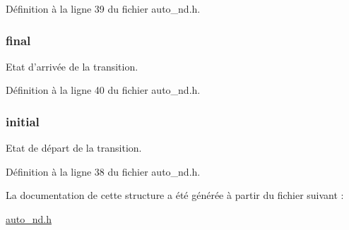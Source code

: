 \-Définition à la ligne 39 du fichier auto\-\_\-nd.\-h.

\hypertarget{struct_transition_abbe5fcc45cc44e9057bc028de5aed8a0}{
\subsubsection[{final}]{ {\bf final}}}\label{struct_transition_abbe5fcc45cc44e9057bc028de5aed8a0}
\-Etat d'arrivée de la transition. 

\-Définition à la ligne 40 du fichier auto\-\_\-nd.\-h.

\hypertarget{struct_transition_a90d9e6858a2ca20ec81be04500590396}{
\subsubsection[{initial}]{ {\bf initial}}}\label{struct_transition_a90d9e6858a2ca20ec81be04500590396}
\-Etat de départ de la transition. 

\-Définition à la ligne 38 du fichier auto\-\_\-nd.\-h.



\-La documentation de cette structure a été générée à partir du fichier suivant \-:\begin{DoxyCompactItemize}
\item 
\hyperlink{auto__nd_8h}{auto\-\_\-nd.\-h}\end{DoxyCompactItemize}
